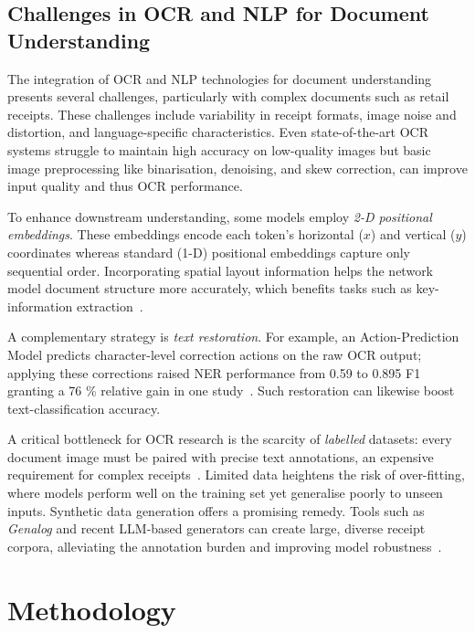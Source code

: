 \documentclass{SGGW-thesis-EN}
\begin{document}
\section{Challenges in OCR and NLP for Document Understanding}

The integration of OCR and NLP technologies for document understanding presents several
challenges, particularly with complex documents such as retail receipts.
These challenges include variability in receipt formats, image noise and distortion, and
language-specific characteristics.
Even state-of-the-art OCR systems struggle to maintain high accuracy on low-quality images but
basic image preprocessing like binarisation, denoising, and skew correction, can improve
input quality and thus OCR performance.

To enhance downstream understanding, some models employ \emph{2-D positional embeddings}.
These embeddings encode each token’s horizontal (\(x\)) and vertical (\(y\)) coordinates
whereas standard (1-D) positional embeddings capture only sequential order.
Incorporating spatial layout information helps the network model document structure more
accurately, which benefits tasks such as key-information extraction~\cite{subramani2021surveydeeplearningapproaches}.

A complementary strategy is \emph{text restoration}.
For example, an Action-Prediction Model predicts character-level correction actions on the
raw OCR output; applying these corrections raised NER performance from 0.59 to 0.895 F1 granting
a 76 \% relative gain in one study~\cite{gupte2021lightscameraactionframework}.
Such restoration can likewise boost text-classification accuracy.

A critical bottleneck for OCR research is the scarcity of \emph{labelled} datasets: every
document image must be paired with precise text annotations, an expensive requirement for
complex receipts~\cite{subramani2021surveydeeplearningapproaches}.
Limited data heightens the risk of over-fitting, where models perform well on the training
set yet generalise poorly to unseen inputs.
Synthetic data generation offers a promising remedy.
Tools such as \textit{Genalog} and recent LLM-based generators can create large, diverse
receipt corpora, alleviating the annotation burden and improving model robustness~\cite{gupte2021lightscameraactionframework}.


\chapter{Methodology}
\end{document}
